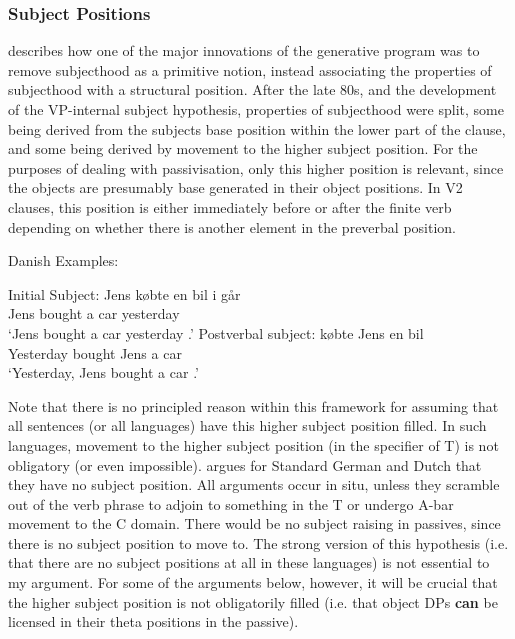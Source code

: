 \subsubsection{Subject Positions}\label{sec:subjpos}
\cite{McCloskey.1997} describes how one of the major innovations of the generative program was to remove subjecthood as a primitive notion, instead associating the properties of subjecthood with a structural position. After the late 80s, and the development of the VP-internal subject hypothesis, properties of subjecthood were split, some being derived from the subjects base position within the lower part of the clause, and some being derived by movement to the higher subject position. For the purposes of dealing with passivisation, only this higher position is relevant, since the objects are presumably base generated in their object positions. In V2 clauses, this position is either immediately before or after the finite verb depending on whether there is another element in the preverbal position.
\begin{exe}
\ex Danish Examples:
\begin{xlist}
\ex Initial Subject:
\gll Jens købte en bil {i går}\\
Jens bought a car yesterday\\
\trans `Jens bought a car yesterday \citep[575--576]{Allan.1995}.'
\ex Postverbal subject:
 købte Jens en bil\\
Yesterday bought Jens a car\\
\trans `Yesterday, Jens bought a car \citep[575--576]{Allan.1995}.' 
\end{xlist}
\end{exe}

Note that there is no principled reason within this framework for assuming that all sentences (or all languages) have this higher subject position filled. In such languages, movement to the higher subject position (in the specifier of T) is not obligatory (or even impossible). \cite{Besten.1990} argues for Standard German and Dutch that they have no subject position. All arguments occur in situ, unless they scramble out of the verb phrase to adjoin to something in the T or undergo A-bar movement to the C domain. There would be no subject raising in passives, since there is no subject position to move to. The strong version of this hypothesis (i.e. that there are no subject positions at all in these languages) is not essential to my argument. For some of the arguments below, however, it will be crucial that the higher subject position is not obligatorily filled (i.e. that object DPs \textbf{can} be licensed in their theta positions in the passive).

